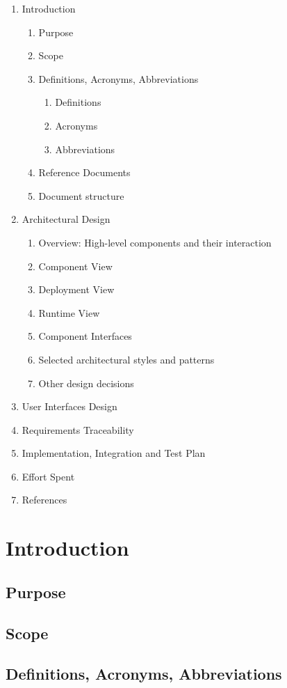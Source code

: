 \documentclass{article}
\begin{document}
	\begin{enumerate}
			\item Introduction
			\begin{enumerate}
				\item Purpose
				\item Scope
				\item Definitions, Acronyms, Abbreviations
				\begin{enumerate}
					\item Definitions
					\item Acronyms
					\item Abbreviations
				\end{enumerate}
				\item Reference Documents
				\item Document structure
			\end{enumerate}
			\item Architectural Design
			\begin{enumerate}
				\item Overview: High-level components and their interaction
				\item Component View
				\item Deployment View
				\item Runtime View
				\item Component Interfaces
				\item Selected architectural styles and patterns
				\item Other design decisions
			\end{enumerate}
			\item User Interfaces Design
			\item Requirements Traceability
			\item Implementation, Integration and Test Plan
			\item Effort Spent
			\item References
	\end{enumerate}
	\newpage
\section{Introduction}
\subsection{Purpose}
\subsection{Scope}
\subsection{Definitions, Acronyms, Abbreviations}
\end{document}
